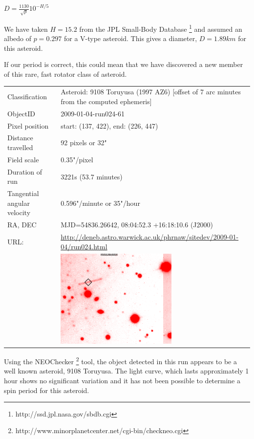   $D = \frac{1130}{\sqrt{p}}10^{-H/5} $

  We have taken $H = 15.2$ from the JPL Small-Body Database \footnote{http://ssd.jpl.nasa.gov/sbdb.cgi} and assumed an albedo of $ p = 0.297$ for a V-type asteroid. This gives a diameter, $D = 1.89 km$ for this asteroid. 

  If our period is correct, this could mean that we have discovered a new member of this rare, fast rotator class of asteroid. 

  \newpage

  \begin{tabular}{l l}
  Classification & Asteroid: 9108 Toruyusa (1997 AZ6) [offset of 7 arc minutes from the computed ephemeris]\\
  ObjectID & 2009-01-04-run024-61 \\
  Pixel position & start: (137, 422), end: (226, 447) \\
  Distance travelled & 92 pixels or 32" \\
  Field scale & 0.35"/pixel \\
  Duration of run & 3221s (53.7 minutes) \\
  Tangential angular velocity & 0.596"/minute or 35"/hour\\ 
  RA, DEC & MJD=54836.26642, 08:04:52.3 +16:18:10.6 (J2000) \\
  URL: & \small \url{http://deneb.astro.warwick.ac.uk/phrnaw/sitedev/2009-01-04/run024.html} \\
       & \includegraphics[width=60mm]{images/2009-01-04-run024-61.png} \\
  \end{tabular}

  Using the NEOChecker \footnote{http://www.minorplanetcenter.net/cgi-bin/checkneo.cgi} tool, the object detected in this run appears to be a well known asteroid, 9108 Toruyusa. The light curve, which lasts approximately 1 hour shows no significant variation and it has not been possible to determine a spin period for this asteroid.  

  
